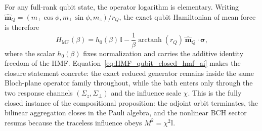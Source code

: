 For any full-rank qubit state, the operator logarithm is elementary. Writing
$\hat{\mathbf m}_Q=(m_\perp\cos\phi,m_\perp\sin\phi,m_z)/r_Q$, the exact qubit
Hamiltonian of mean force is therefore
\begin{equation}
    H_{\mathrm{MF}}(\beta)
    = h_0(\beta)\,\mathbb I
    - \frac{1}{\beta}\operatorname{arctanh}(r_Q)\,
      \hat{\mathbf m}_Q\!\cdot\!\boldsymbol{\sigma},
    \label{eq:HMF_qubit_closed_hmf_ai}
\end{equation}
where the scalar $h_0(\beta)$ fixes normalization and carries the additive
identity freedom of the HMF. Equation~\eqref{eq:HMF_qubit_closed_hmf_ai} makes
the closure statement concrete: the exact reduced generator remains inside the
same Bloch-plane operator family throughout, while the bath enters only through
the two response channels $(\Sigma_z,\Sigma_\perp)$ and the influence scale
$\chi$. This is the fully closed instance of the compositional proposition:
the adjoint orbit terminates, the bilinear aggregation closes in the Pauli
algebra, and the nonlinear BCH sector resums because the traceless influence
obeys $M^2=\chi^2\mathbb I$.
